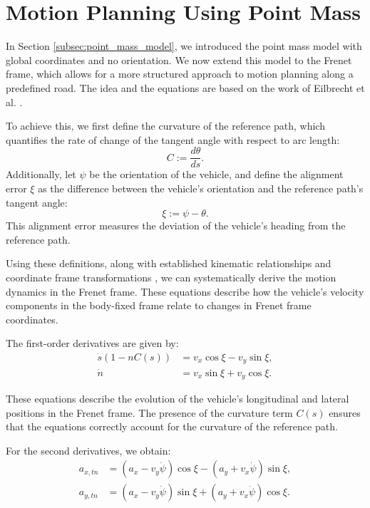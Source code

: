 \section{Motion Planning Using Point Mass} \label{sec:motion_planning_using_point_mass}

In Section \ref{subsec:point_mass_model}, we introduced the point mass model with global coordinates and no orientation.
We now extend this model to the Frenet frame, which allows for a more structured approach to motion planning along a predefined road.
The idea and the equations are based on the work of Eilbrecht et al.
\cite{eilbrecht_challenges_2020}.

To achieve this, we first define the curvature of the reference path, which quantifies the rate of change of the tangent angle with respect to arc length:
\begin{equation}
	C := \frac{d\theta}{ds}.
\end{equation}
Additionally, let $\psi$ be the orientation of the vehicle, and define the alignment error $\xi$ as the difference between the vehicle's orientation and the reference path's tangent angle:
\begin{equation}
	\xi := \psi - \theta.
\end{equation}
This alignment error measures the deviation of the vehicle's heading from the reference path.

Using these definitions, along with established kinematic relationships and coordinate frame transformations \cite{eilbrecht_challenges_2020}, we can
systematically derive the motion dynamics in the Frenet frame.
These equations describe how the vehicle's velocity components in the body-fixed frame relate to changes in Frenet frame coordinates.

The first-order derivatives are given by:
\begin{align}
	\dot{s}(1 - nC(s)) & = v_x\cos{\xi} - v_y\sin{\xi}, \label{eq:first_derivative_long} \\
	\dot{n}            & = v_x\sin{\xi} + v_y\cos{\xi}. \label{eq:first_derivative_lat}
\end{align}

These equations describe the evolution of the vehicle's longitudinal and lateral positions in the Frenet frame.
The presence of the curvature term $C(s)$ ensures that the equations correctly account for the curvature of the reference path.

For the second derivatives, we obtain:
\begin{align}
	a_{x,tn} & = (a_x - v_y\dot{\psi})\cos{\xi} - (a_y + v_x\dot{\psi})\sin{\xi}, \label{eq:second_derivative_long} \\
	a_{y,tn} & = (a_x - v_y\dot{\psi})\sin{\xi} + (a_y + v_x\dot{\psi})\cos{\xi}. \label{eq:second_derivative_lat}
\end{align}

